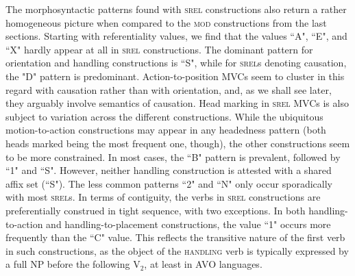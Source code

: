 
The morphosyntactic patterns found with \textsc{srel} constructions also return a rather homogeneous picture when compared to the \textsc{mod} constructions from the last sections. Starting with referentiality values, we find that the values ``A", ``E", and ``X" hardly appear at all in \textsc{srel} constructions. The dominant pattern for orientation and handling constructions is ``S", while for \textsc{srel}s denoting causation, the "D" pattern is predominant. Action-to-position MVCs seem to cluster in this regard with causation rather than with orientation, and, as we shall see later, they arguably involve semantics of causation. Head marking in \textsc{srel} MVCs is also subject to variation across the different constructions. While the ubiquitous motion-to-action constructions may appear in any headedness pattern (both heads marked being the most frequent one, though), the other constructions seem to be more constrained. In most cases, the ``B" pattern is prevalent, followed by ``1" and ``S". However, neither handling construction is attested with a shared affix set (``S"). The less common patterns ``2" and ``N" only occur sporadically with most \textsc{srel}s. In terms of contiguity, the verbs in \textsc{srel} constructions are preferentially construed in tight sequence, with two exceptions. In both handling-to-action and handling-to-placement constructions, the value ``1" occurs more frequently than the ``C" value. This reflects the transitive nature of the first verb in such constructions, as the object of the \textsc{handling} verb is typically expressed by a full NP before the following V$_2$, at least in AVO languages.


